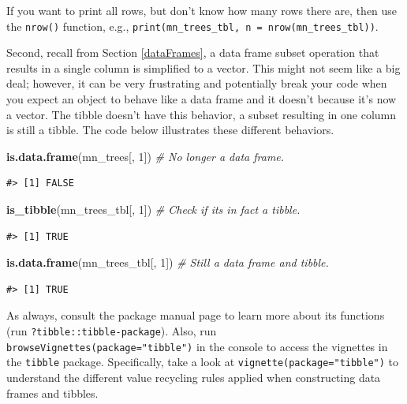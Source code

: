 \documentclass[
  11pt,
]{krantz}
\newenvironment{Shaded}{\begin{snugshade}}{\end{snugshade}}
\newcommand{\CommentTok}[1]{\textcolor[rgb]{0.56,0.35,0.01}{\textit{#1}}}
\newcommand{\DecValTok}[1]{\textcolor[rgb]{0.00,0.00,0.81}{#1}}
\newcommand{\KeywordTok}[1]{\textcolor[rgb]{0.13,0.29,0.53}{\textbf{#1}}}
\newcommand{\NormalTok}[1]{#1}
\theoremstyle{definition}
\theoremstyle{definition}
\theoremstyle{definition}
\theoremstyle{definition}
\theoremstyle{remark}
\begin{document}
If you want to print all rows, but don't know how many rows there are, then use the \texttt{nrow()} function, e.g., \texttt{print(mn\_trees\_tbl,\ n\ =\ nrow(mn\_trees\_tbl))}.

Second, recall from Section \ref{dataFrames}, a data frame subset operation that results in a single column is simplified to a vector. This might not seem like a big deal; however, it can be very frustrating and potentially break your code when you expect an object to behave like a data frame and it doesn't because it's now a vector. The tibble doesn't have this behavior, a subset resulting in one column is still a tibble. The code below illustrates these different behaviors.

\begin{Shaded}
\begin{Highlighting}[]
\KeywordTok{is.data.frame}\NormalTok{(mn\_trees[, }\DecValTok{1}\NormalTok{]) }\CommentTok{\# No longer a data frame.}
\end{Highlighting}
\end{Shaded}

\begin{verbatim}
#> [1] FALSE
\end{verbatim}

\begin{Shaded}
\begin{Highlighting}[]
\KeywordTok{is\_tibble}\NormalTok{(mn\_trees\_tbl[, }\DecValTok{1}\NormalTok{]) }\CommentTok{\# Check if it\textquotesingle{}s in fact a tibble.}
\end{Highlighting}
\end{Shaded}

\begin{verbatim}
#> [1] TRUE
\end{verbatim}

\begin{Shaded}
\begin{Highlighting}[]
\KeywordTok{is.data.frame}\NormalTok{(mn\_trees\_tbl[, }\DecValTok{1}\NormalTok{]) }\CommentTok{\# Still a data frame and tibble.}
\end{Highlighting}
\end{Shaded}

\begin{verbatim}
#> [1] TRUE
\end{verbatim}

As always, consult the package manual page to learn more about its functions (run \texttt{?tibble::tibble-package}). Also, run \texttt{browseVignettes(package="tibble")} in the console to access the vignettes in the \texttt{tibble} package. Specifically, take a look at \texttt{vignette(package="tibble")} to understand the different value recycling rules applied when constructing data frames and tibbles.
\end{document}
